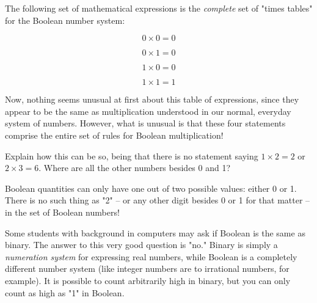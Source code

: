 

The following set of mathematical expressions is the {\it complete} set of "times tables" for the Boolean number system:

$$0 \times 0 = 0$$

$$0 \times 1 = 0$$

$$1 \times 0 = 0$$

$$1 \times 1 = 1$$

Now, nothing seems unusual at first about this table of expressions, since they appear to be the same as multiplication understood in our normal, everyday system of numbers.  However, what is unusual is that these four statements comprise the entire set of rules for Boolean multiplication!

Explain how this can be so, being that there is no statement saying $1 \times 2 = 2$ or $2 \times 3 = 6$.  Where are all the other numbers besides 0 and 1?







Boolean quantities can only have one out of two possible values: either 0 or 1.  There is no such thing as "2" -- or any other digit besides 0 or 1 for that matter -- in the set of Boolean numbers!







Some students with background in computers may ask if Boolean is the same as binary.  The answer to this very good question is "no."  Binary is simply a {\it numeration system} for expressing real numbers, while Boolean is a completely different number system (like integer numbers are to irrational numbers, for example).  It is possible to count arbitrarily high in binary, but you can only count as high as "1" in Boolean.




